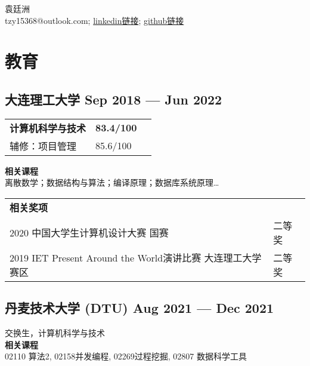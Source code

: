 \documentclass[a4,12pt]{article}
\begin{document}
\begin{center}
    \begin{minipage}[b]{0.5\textwidth}
            \centering
            {\huge 袁廷洲} \\ %
            \vspace{0.1cm}
            tzy15368@outlook.com;           \href{https://www.linkedin.com/in/tingzhou-yuan-aa7718214;}{linkedin链接}; 
            \href{https://github.com/tzy15368}{github链接}
    \end{minipage}%
     
\end{center}
\vspace{-0.35cm}
\section{\textbf{教育}}
\subsection*{大连理工大学 \hfill \textbf{Sep 2018 --- Jun 2022}}
\begin{tabular}{p{20em} p{21em} p{43em}}
\textbf{计算机科学与技术} & \textbf{83.4/100}\\
辅修：项目管理 & 85.6/100\\
\end{tabular}

\textbf{\small 相关课程}\\
离散数学；数据结构与算法；编译原理；数据库系统原理…

\begin{tabular}{p{30em} p{21em}}
\textbf{\small 相关奖项} & \\
2020 中国大学生计算机设计大赛 国赛 & 二等奖 \\
2019 IET Present Around the World演讲比赛 大连理工大学赛区 & 二等奖 \\
\end{tabular}

\vspace{-0.3cm}
\subsection*{丹麦技术大学 (DTU) \hfill \textbf{Aug 2021 --- Dec 2021}}
交换生，计算机科学与技术 \\ 
\textbf{\small 相关课程} \\ 
\small 02110 算法2, 02158并发编程, 02269过程挖掘, 02807 数据科学工具\normalsize \\
\end{document}
